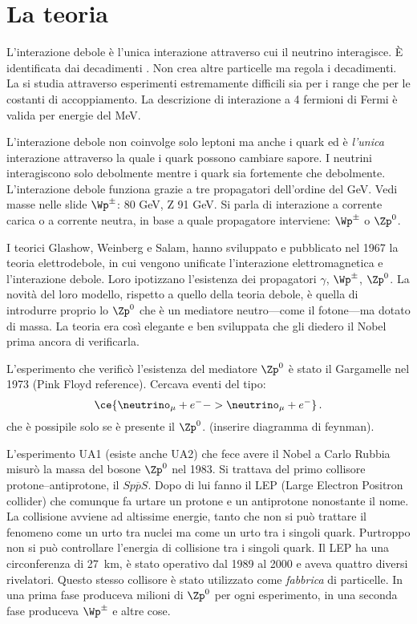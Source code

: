     \section{La teoria}
        L'interazione debole è l'unica interazione attraverso cui il neutrino interagisce. È identificata dai decadimenti \betap. Non crea altre particelle ma regola i decadimenti. La si studia attraverso esperimenti estremamente difficili sia per i range che per le costanti di accoppiamento. La descrizione di interazione a 4 fermioni di Fermi è valida per energie del \unit{\mega\eV}.
        
        L'interazione debole non coinvolge solo leptoni ma anche i quark ed è \emph{l'unica} interazione attraverso la quale i quark possono cambiare sapore. I neutrini interagiscono solo debolmente mentre i quark sia fortemente che debolmente. L'interazione debole funziona grazie a tre propagatori dell'ordine del \unit{\giga\eV}. Vedi masse nelle slide $\Wp^\pm$: 80 GeV, Z 91 GeV. Si parla di interazione a corrente carica o a corrente neutra, in base a quale propagatore interviene: $\Wp^\pm$ o $\Zp^0$.

        I teorici Glashow, Weinberg e Salam, hanno sviluppato e pubblicato nel 1967 la teoria elettrodebole, in cui vengono unificate l'interazione elettromagnetica e l'interazione debole. Loro ipotizzano l'esistenza dei propagatori $\gamma$, $\Wp^\pm$, $\Zp^0$. La novità del loro modello, rispetto a quello della teoria debole, è quella di introdurre proprio lo $\Zp^0$ che è un mediatore neutro---come il fotone---ma dotato di massa. La teoria era così elegante e ben sviluppata che gli diedero il Nobel prima ancora di verificarla.

        L'esperimento che verificò l'esistenza del mediatore $\Zp^0$ è stato il Gargamelle nel 1973 (Pink Floyd reference). Cercava eventi del tipo:
        \begin{equation*}
            \ce{\neutrino_{\mu} + e^- -> \neutrino_{\mu} + e^-}\,.
        \end{equation*}
        che è possipile solo se è presente il $\Zp^0$. (inserire diagramma di feynman).

        L'esperimento UA1 (esiste anche UA2) che fece avere il Nobel a Carlo Rubbia misurò la massa del bosone $\Zp^0$ nel 1983. Si trattava del primo collisore protone--antiprotone, il $Sp\overline{p}S$. Dopo di lui fanno il LEP (Large Electron Positron collider) che comunque fa urtare un protone e un antiprotone nonostante il nome. La collisione avviene ad altissime energie, tanto che non si può trattare il fenomeno come un urto tra nuclei ma come un urto tra i singoli quark. Purtroppo non si può controllare l'energia di collisione tra i singoli quark. Il LEP ha una circonferenza di \SI{27}{\kilo\meter}, è stato operativo dal 1989 al 2000 e aveva quattro diversi rivelatori. Questo stesso collisore è stato utilizzato come \emph{fabbrica} di particelle. In una prima fase produceva milioni di $\Zp^0$ per ogni esperimento, in una seconda fase produceva $\Wp^\pm$ e altre cose.

